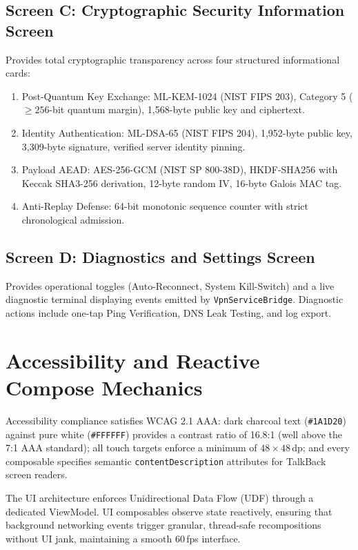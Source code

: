\subsection{Screen C: Cryptographic Security Information Screen}
Provides total cryptographic transparency across four structured informational cards:
\begin{enumerate}
    \item Post-Quantum Key Exchange: ML-KEM-1024 (NIST FIPS 203), Category 5 ($\ge 256$-bit quantum margin), 1,568-byte public key and ciphertext.
    \item Identity Authentication: ML-DSA-65 (NIST FIPS 204), 1,952-byte public key, 3,309-byte signature, verified server identity pinning.
    \item Payload AEAD: AES-256-GCM (NIST SP 800-38D), HKDF-SHA256 with Keccak SHA3-256 derivation, 12-byte random IV, 16-byte Galois MAC tag.
    \item Anti-Replay Defense: 64-bit monotonic sequence counter with strict chronological admission.
\end{enumerate}

\subsection{Screen D: Diagnostics and Settings Screen}
Provides operational toggles (Auto-Reconnect, System Kill-Switch) and a live diagnostic terminal displaying events emitted by \texttt{VpnService}\allowbreak\texttt{Bridge}. Diagnostic actions include one-tap Ping Verification, DNS Leak Testing, and log export.

\section{Accessibility and Reactive Compose Mechanics}
\label{sec:accessibility_compose}

Accessibility compliance satisfies WCAG 2.1 AAA: dark charcoal text (\texttt{\#1A1D20}) against pure white (\texttt{\#FFFFFF}) provides a contrast ratio of 16.8:1 (well above the 7:1 AAA standard); all touch targets enforce a minimum of $48 \times 48$\,dp; and every composable specifies semantic \texttt{contentDescription} attributes for TalkBack screen readers.

The UI architecture enforces Unidirectional Data Flow (UDF) through a dedicated ViewModel. UI composables observe state reactively, ensuring that background networking events trigger granular, thread-safe recompositions without UI jank, maintaining a smooth 60\,fps interface.
